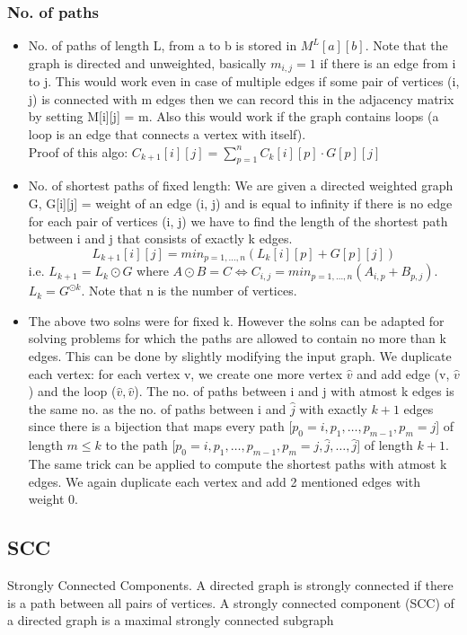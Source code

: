 \documentclass[8pt, a4paper, oneside, twocolumn]{extarticle}
\begin{document}
\subsubsection{No. of paths}
\begin{itemize}
    \item No. of paths of length L, from a to b is stored in $M^L[a][b]$. Note that the graph is directed and unweighted, basically $m_{i, j} = 1$ if there is an edge from i to j. This would work even in case of multiple edges if some pair of vertices (i, j) is connected with m edges then we can record this in the adjacency matrix by setting M[i][j] = m. Also this would work if the graph contains loops (a loop is an edge that connects a vertex with itself).\\Proof of this algo: $C_{k + 1}[i][j] = \sum_{p = 1}^nC_k[i][p]\cdot G[p][j]$
    \item No. of shortest paths of fixed length: We are given a directed weighted graph G, G[i][j] = weight of an edge (i, j) and is equal to infinity if there is no edge for each pair of vertices (i, j) we have to find the length of the shortest path between i and j that consists of exactly k edges. $$L_{k + 1}[i][j] = min_{p = 1, \dots, n}(L_k[i][p] + G[p][j])$$
    i.e. $L_{k + 1} = L_k \odot G$ where $A \odot B = C \Leftrightarrow C_{i, j} = min_{p = 1, \dots, n}(A_{i, p} + B_{p, j})$.\\$L_k = G^{\odot k}$. Note that n is the number of vertices.
    \item The above two solns were for fixed k. However the solns can be adapted for solving problems for which the paths are allowed to contain no more than k edges. This can be done by slightly modifying the input graph. We duplicate each vertex: for each vertex v, we create one more vertex $\hat{v}$ and add edge (v, $\hat{v}$) and the loop ($\hat{v}, \hat{v}$). The no. of paths between i and j with atmost k edges is the same no. as the no. of paths between i and $\hat{j}$ with exactly $k + 1$ edges since there is a bijection that maps every path [$p_0 = i, p_1, \dots, p_{m - 1}, p_m = j$] of length $m \leq k$ to the path [$p_0 = i, p_1, \dots, p_{m - 1}, p_m = j, \hat{j}, \dots, \hat{j}$] of length $k + 1$.
    \\ The same trick can be applied to compute the shortest paths with atmost k edges. We again duplicate each vertex and add 2 mentioned edges with weight 0. 
\end{itemize}

\subsection{SCC}
Strongly Connected Components. A directed graph is strongly connected if there is a path between all pairs of vertices. A strongly connected component (SCC) of a directed graph is a maximal strongly connected subgraph
\end{document}
